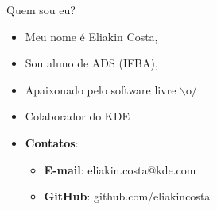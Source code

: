 \begin{frame}{Quem sou eu?}
    \begin{itemize}
        \item Meu nome é Eliakin Costa,
        \item Sou aluno de ADS (IFBA),
        \item Apaixonado pelo software livre $\backslash$o/
        \item Colaborador do KDE
        \item \textbf{Contatos}:
        \begin{itemize}
            \item \textbf{E-mail}: eliakin.costa@kde.com
            \item \textbf{GitHub}: github.com/eliakincosta
        \end{itemize}
    \end{itemize}
\end{frame}
%